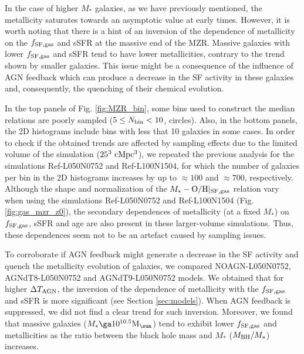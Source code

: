 \documentclass[useAMS,usenatbib]{mn2e}
\begin{document}
In the case of higher $M_*$ galaxies, as we have previously mentioned, the metallicity saturates
towards an asymptotic value at early times.  
However, it is worth noting that there is a hint of an inversion of the dependence of metallicity on the 
$f_{\rm SF,gas}$ and sSFR at the massive end of the MZR.  Massive galaxies with lower $f_{\rm SF,gas}$ and sSFR 
tend to have lower metallicities, contrary to the trend shown by smaller galaxies.
This issue might be a consequence of the influence of AGN feedback which can produce a decrease
in the SF activity in these galaxies and, consequently, the quenching of their chemical evolution. 

In the top panels of Fig. \ref{fig:MZR_bin}, some bins used to construct the median relations 
are poorly sampled ($5 \le N_{\rm bin} < 10$, circles). Also, in the bottom
panels, the 2D histograms include bins with less that 10 galaxies in some cases.  
In order to check if the obtained trends are affected by
sampling effects due to the limited volume of the simulation ($25^3 \ {\rm cMpc^3}$), we repeated the previous
analysis for the simulations Ref-L050N0752 and Ref-L100N1504, for which the number of galaxies per bin in
the 2D histograms increases by up to $\approx 100$ and $\approx 700$, respectively.  Although  
the shape and normalization of the $M_* - {\rm O/H}|_{\rm SF,gas}$  relation 
vary when using the simulations Ref-L050N0752 and Ref-L100N1504 (Fig. \ref{fig:gas_mzr_z0}), the 
secondary dependences of metallicity (at a fixed $M_*$) on $f_{\rm SF,gas}$, sSFR and age are
also present in these larger-volume simulations.  Thus, these dependences seem not to be an artefact caused
by sampling issues.


To corroborate if AGN feedback might generate a decrease in the SF activity and quench the metallicity
evolution of galaxies, we compared 
NOAGN-L050N0752, AGNdT8-L050N0752 and AGNdT9-L050N0752 models.  
We obtained that for higher $\Delta T_{\rm AGN}$,
the inversion of the dependence of metallicity with the $f_{\rm SF,gas}$ and sSFR is more significant (see Section \ref{sec:models}).
When AGN feedback is suppressed, we did not find a clear trend for such inversion. 
Moreover, we found that massive galaxies ($M_* \ga 10^{10.5} {\rm M}_{\sun}$) tend to exhibit lower 
$f_{\rm SF,gas}$ and metallicities as the ratio between the black hole mass and $M_*$ ($M_{\rm BH}/M_*$) increases.  
\end{document}
